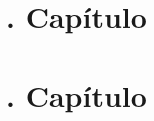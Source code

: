 \setcounter{section}{2}
\section[Stein y Shakarchi]{\cite{stein}. Capítulo}



\setcounter{section}{4}
\section[Stein y Shakarchi]{\cite{stein}. Capítulo}



